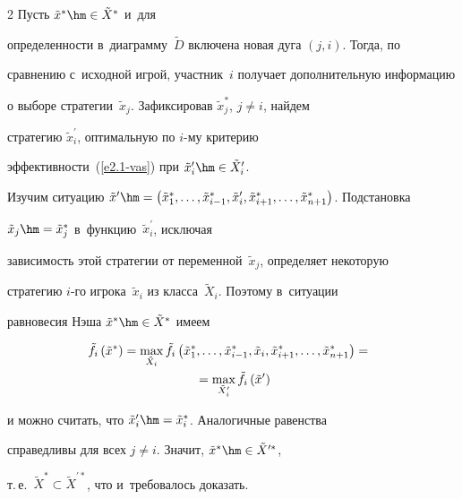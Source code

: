 \begin{multicols}{2}
Пусть $\tilde{x}^*\hm\in \tilde{X}^*$ и~для

определенности в~диаграмму~$\tilde{D}$ включена новая дуга $(j,i)$. Тогда, по

сравнению с~исходной игрой, участник~$i$ получает дополнительную информацию

о выборе стратегии~$\tilde{x}_j$. Зафиксировав $\tilde{x}_j^*$, $j\not= i$, \mbox{найдем}

стратегию $\tilde{x}_i^\prime$, оптимальную по \mbox{$i$-му} критерию

эффективности~(\ref{e2.1-vas}) при $\tilde{x}_i^\prime\hm\in \tilde{X}_i^\prime$.

\mbox{Изучим} ситуацию $\tilde{x}^\prime \hm= \left( \tilde{x}_1^*,\ldots, \tilde{x}_{i-1}^*,

\tilde{x}_i^\prime, \tilde{x}^*_{i+1},\ldots, \tilde{x}^*_{n+1}\right)$. Подстановка

$\tilde{x}_j\hm= \tilde{x}^*_j$ в~функцию~$\tilde{x}^\prime_i$, исключая

зависимость этой стратегии от переменной~$\tilde{x}_j$, определяет некоторую

стратегию $i$-го игрока~$\tilde{x}_i$ из класса~$\tilde{X}_i$. Поэтому в~ситуации

равновесия Нэша $\tilde{x}^*\hm\in \tilde{X}^*$ имеем

  \begin{multline*}

   \! \!\!\tilde{f}_i \left( \tilde{x}^*\right) =\max\limits_{\tilde{X}_i} \tilde{f}_i \left(

\tilde{x}^*_1, \ldots, \tilde{x}^*_{i-1},\tilde{x}_i, \tilde{x}^*_{i+1},\ldots,

\tilde{x}^*_{n+1}\right) ={}\hspace*{-0.3pt}\\

{}= \max\limits_{\tilde{X}^\prime_i} \tilde{f}_i\left(

\tilde{x}^\prime\right)

    \end{multline*}

и можно считать, что $\tilde{x}^\prime_i\hm= \tilde{x}^*_i$. Аналогичные равенства

справедливы для всех $j\not=i$. Значит, $\tilde{x}^*\hm\in \tilde{X}^{\prime *}$,

т.\,е.\  $\tilde{X}^*\subset \tilde{X}^{\prime *}$, что и~требовалось доказать.



\smallskip






\end{multicols}
